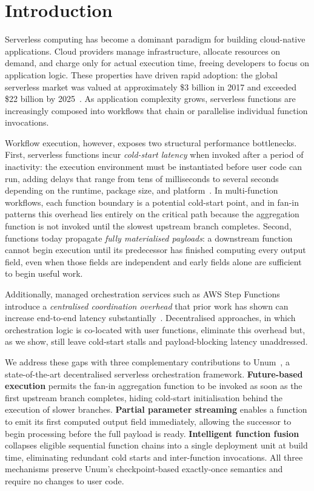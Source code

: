 \documentclass[runningheads]{llncs}
\begin{document}
\section{Introduction}
\label{sec:introduction}

Serverless computing has become a dominant paradigm for building cloud-native applications. Cloud providers manage infrastructure, allocate resources on demand, and charge only for actual execution time, freeing developers to focus on application logic. These properties have driven rapid adoption: the global serverless market was valued at approximately \$3 billion in 2017 and exceeded \$22 billion by 2025~\cite{wen2022riseplanetserverlesscomputing,PrecedenceResearch2025}. As application complexity grows, serverless functions are increasingly composed into workflows that chain or parallelise individual function invocations.

Workflow execution, however, exposes two structural performance bottlenecks. First, serverless functions incur \emph{cold-start latency} when invoked after a period of inactivity: the execution environment must be instantiated before user code can run, adding delays that range from tens of milliseconds to several seconds depending on the runtime, package size, and platform~\cite{lin2019mitigatingcoldstartsserverless,wurz2020migrating,shahrad2020serverless}. In multi-function workflows, each function boundary is a potential cold-start point, and in fan-in patterns this overhead lies entirely on the critical path because the aggregation function is not invoked until the slowest upstream branch completes. Second, functions today propagate \emph{fully materialised payloads}: a downstream function cannot begin execution until its predecessor has finished computing every output field, even when those fields are independent and early fields alone are sufficient to begin useful work.

Additionally, managed orchestration services such as AWS Step Functions introduce a \emph{centralised coordination overhead} that prior work has shown can increase end-to-end latency substantially~\cite{285171,285113}. Decentralised approaches, in which orchestration logic is co-located with user functions, eliminate this overhead but, as we show, still leave cold-start stalls and payload-blocking latency unaddressed.

We address these gaps with three complementary contributions to Unum~\cite{285171}, a state-of-the-art decentralised serverless orchestration framework. \textbf{Future-based execution} permits the fan-in aggregation function to be invoked as soon as the first upstream branch completes, hiding cold-start initialisation behind the execution of slower branches. \textbf{Partial parameter streaming} enables a function to emit its first computed output field immediately, allowing the successor to begin processing before the full payload is ready. \textbf{Intelligent function fusion} collapses eligible sequential function chains into a single deployment unit at build time, eliminating redundant cold starts and inter-function invocations. All three mechanisms preserve Unum's checkpoint-based exactly-once semantics and require no changes to user code.
\end{document}
